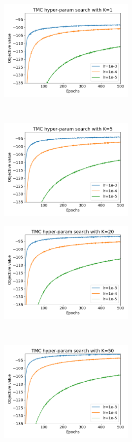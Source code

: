 \begin{figure}[th!]
    \centering
    \begin{subfigure}[t]{0.5\textwidth}
    \hspace*{-2cm}
        \centering
        \includegraphics[height=5cm]{../openreview/Figures/hp_s_1.png}
    \end{subfigure}%
    ~ 
    \begin{subfigure}[t]{0.5\textwidth}
        \centering
        \includegraphics[height=5cm]{../openreview/Figures/hp_s_5.png}
    \end{subfigure}
        \begin{subfigure}[t]{0.5\textwidth}
    \hspace*{-2cm}
        \centering
        \includegraphics[height=5cm]{../openreview/Figures/hp_s_20.png}
    \end{subfigure}%
    ~ 
    \begin{subfigure}[t]{0.5\textwidth}
        \centering
        \includegraphics[height=5cm]{../openreview/Figures/hp_s_50.png}

\end{subfigure}
\end{figure}
